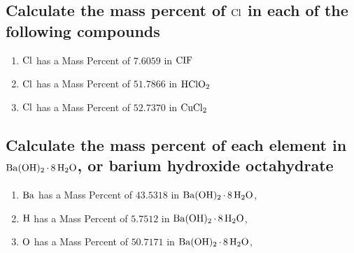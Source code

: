 \documentclass[11pt]{article}
\begin{document}
\subsection{Calculate the mass percent of \(\ce{Cl}\) in each of the following compounds}
\label{sec:org07248a3}
\begin{enumerate}
\item \(\ce{Cl}\)  has a Mass Percent of \(7.6059\) in \(\ce{CIF}\)
\item \(\ce{Cl}\)  has a Mass Percent of \(51.7866\) in \(\ce{HClO2}\)
\item \(\ce{Cl}\)  has a Mass Percent of \(52.7370\) in \(\ce{CuCl2}\)
\end{enumerate}

\subsection{Calculate the mass percent of each element in \(\ce{Ba(OH)2*8H2O}\), or barium hydroxide octahydrate}
\label{sec:org41c6405}
\begin{enumerate}
\item \(\ce{Ba}\)  has a Mass Percent of \(43.5318\) in \(\ce{Ba(OH)2*8H2O}\),
\item \(\ce{H}\)  has a Mass Percent of \(5.7512\) in \(\ce{Ba(OH)2*8H2O}\),
\item \(\ce{O}\)  has a Mass Percent of \(50.7171\) in \(\ce{Ba(OH)2*8H2O}\),
\end{enumerate}
\end{document}
